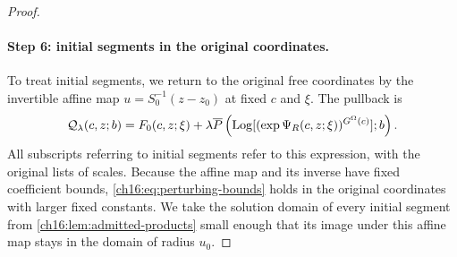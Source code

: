 \begin{proof}
\paragraph{Step 6: initial segments in the original coordinates.}
To treat initial segments, we return to the original free coordinates by the invertible affine map $u=S_0^{-1}(z-z_0)$ at fixed $c$ and $\xi$. The pullback is
\begin{equation}\label{ch16:eq:raw-controlled-objective}
 \mathcal Q_\lambda(c,z;b)=F_0(c,z;\xi)
   +\lambda\overline P\left(
       \operatorname{Log}[(\exp\Psi_R(c,z;\xi))^{G^\Omega(c)}];b\right).
\end{equation}
All subscripts referring to initial segments refer to this expression, with the original lists of scales. Because the affine map and its inverse have fixed coefficient bounds, \eqref{ch16:eq:perturbing-bounds} holds in the original coordinates with larger fixed constants. We take the solution domain of every initial segment from \cref{ch16:lem:admitted-products} small enough that its image under this affine map stays in the domain of radius $u_0$.


\end{proof}
